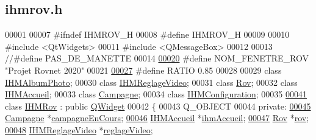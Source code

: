 \hypertarget{ihmrov_8h_source}{}\subsection{ihmrov.\+h}
\label{ihmrov_8h_source}

\begin{DoxyCode}
00001 
00007 \textcolor{preprocessor}{#ifndef IHMROV\_H}
00008 \textcolor{preprocessor}{#define IHMROV\_H}
00009 
00010 \textcolor{preprocessor}{#include <QtWidgets>}
00011 \textcolor{preprocessor}{#include <QMessageBox>}
00012 
00013 \textcolor{comment}{//#define PAS\_DE\_MANETTE}
00014 
\hyperlink{ihmrov_8h_aa7e4fcf0d5f67b5c84de425d1f4776ea}{00020} \textcolor{preprocessor}{#define NOM\_FENETRE\_ROV "Projet Rovnet 2020"}
00021 
\hyperlink{ihmrov_8h_a7e8b3c8482e593df0ace933ad3de22ee}{00027} \textcolor{preprocessor}{#define RATIO           0.85}
00028 
00029 \textcolor{keyword}{class }\hyperlink{class_i_h_m_album_photo}{IHMAlbumPhoto};
00030 \textcolor{keyword}{class }\hyperlink{class_i_h_m_reglage_video}{IHMReglageVideo};
00031 \textcolor{keyword}{class }\hyperlink{class_rov}{Rov};
00032 \textcolor{keyword}{class }\hyperlink{class_i_h_m_accueil}{IHMAccueil};
00033 \textcolor{keyword}{class }\hyperlink{class_campagne}{Campagne};
00034 \textcolor{keyword}{class }\hyperlink{class_i_h_m_configuration}{IHMConfiguration};
00035 
\hyperlink{class_i_h_m_rov}{00041} \textcolor{keyword}{class }\hyperlink{class_i_h_m_rov}{IHMRov} : \textcolor{keyword}{public} \hyperlink{class_q_widget}{QWidget}
00042 \{
00043     Q\_OBJECT
00044 \textcolor{keyword}{private}:
\hyperlink{class_i_h_m_rov_af0475e935531b7331f097ae13d07989b}{00045}     \hyperlink{class_campagne}{Campagne} *\hyperlink{class_i_h_m_rov_af0475e935531b7331f097ae13d07989b}{campagneEnCours};       
\hyperlink{class_i_h_m_rov_aa22f6fe8daf5c67071ec02a348e5cc3e}{00046}     \hyperlink{class_i_h_m_accueil}{IHMAccueil} *\hyperlink{class_i_h_m_rov_aa22f6fe8daf5c67071ec02a348e5cc3e}{ihmAccueil};          
\hyperlink{class_i_h_m_rov_a777ca33fdb295ba6b6773e880356fa1e}{00047}     \hyperlink{class_rov}{Rov} *\hyperlink{class_i_h_m_rov_a777ca33fdb295ba6b6773e880356fa1e}{rov};                        
\hyperlink{class_i_h_m_rov_a6baa53853d29151404e6ae3dec5d2003}{00048}     \hyperlink{class_i_h_m_reglage_video}{IHMReglageVideo} *\hyperlink{class_i_h_m_rov_a6baa53853d29151404e6ae3dec5d2003}{reglageVideo};   

\end{DoxyCode}
